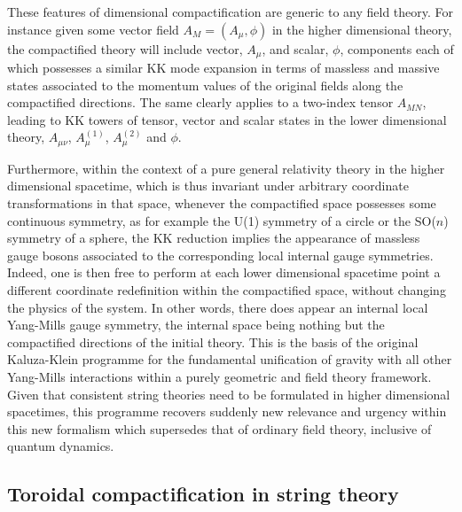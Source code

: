 \documentclass[a4paper,11pt]{article}
\begin{document}
These features of dimensional compactification are generic to any field
theory. For instance given some vector field $A_M=(A_\mu,\phi)$ in the higher 
dimensional theory, the compactified theory will include vector, $A_\mu$, 
and scalar, $\phi$, components each of which possesses a similar KK mode
expansion in terms of massless and massive states associated to the
momentum values of the original fields along the compactified directions.
The same clearly applies to a two-index tensor $A_{MN}$, leading
to KK towers of tensor, vector and scalar states in the lower dimensional
theory, $A_{\mu\nu}$, $A^{(1)}_\mu$, $A^{(2)}_\mu$ and $\phi$.

Furthermore, within the context of a pure general relativity theory in the
higher dimensional spacetime, which is thus invariant under arbitrary 
coordinate transformations in that space, whenever the compactified space 
possesses some continuous symmetry, as for example the U(1) symmetry of a 
circle or the SO($n$) symmetry of a sphere, the KK reduction implies the 
appearance of massless gauge bosons associated to the corresponding local 
internal gauge symmetries. Indeed, one is then free to perform at each
lower dimensional spacetime point a different coordinate redefinition
within the compactified space, without changing the physics of the system.
In other words, there does appear an internal local Yang-Mills gauge symmetry,
the internal space being nothing but the compactified directions of the
initial theory. This is the basis of the original Kaluza-Klein programme
for the fundamental unification of gravity with all other Yang-Mills
interactions within a purely geometric and field theory framework. Given that
consistent string theories need to be formulated in higher dimensional
spacetimes, this programme recovers suddenly new relevance and
urgency within this new formalism which supersedes that of ordinary
field theory, inclusive of quantum dynamics.

\subsection{Toroidal compactification in string theory}
\label{Subsect8.2}
\end{document}
